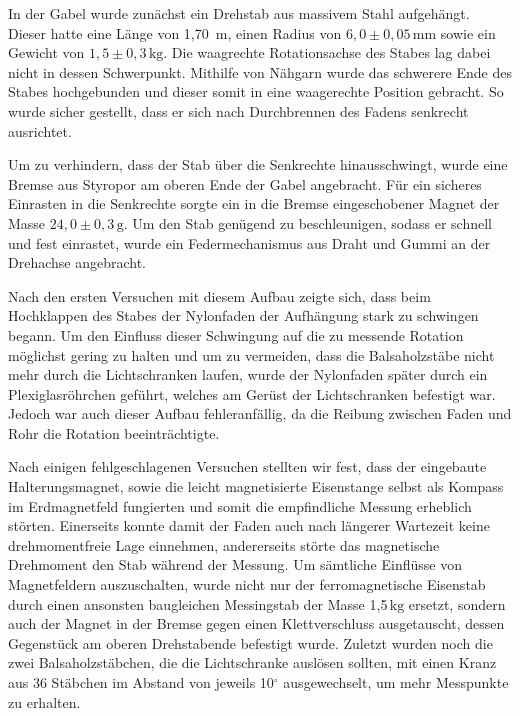 \documentclass[11pt]{scrartcl}
\newcommand{\unit}[1]{\ensuremath{\,\mathrm{#1}}} %
\begin{document}
In der Gabel wurde zun\"achst ein Drehstab aus massivem Stahl aufgeh\"angt. Dieser hatte eine L\"ange von 1,70 \unit{m}, einen Radius von $6,0\pm 0,05\unit{mm}$ sowie ein Gewicht von $1,5\pm 0,3\unit{kg}$. Die waagrechte Rotationsachse des Stabes lag dabei nicht in dessen Schwerpunkt. Mithilfe von N\"ahgarn wurde das schwerere Ende des Stabes hochgebunden und dieser somit in eine waagerechte Position gebracht. So wurde sicher gestellt, dass er sich nach Durchbrennen des Fadens senkrecht ausrichtet.

Um zu verhindern, dass der Stab \"uber die Senkrechte hinausschwingt, wurde eine Bremse aus Styropor am oberen Ende der Gabel angebracht. F\"ur ein sicheres Einrasten in die Senkrechte sorgte ein in die Bremse eingeschobener Magnet der Masse $24,0 \pm 0,3\unit{g}$. Um den Stab gen\"ugend zu beschleunigen, sodass er schnell und fest einrastet, wurde ein Federmechanismus aus Draht und Gummi an der Drehachse angebracht. %
%

Nach den ersten Versuchen mit diesem Aufbau zeigte sich, dass beim Hochklappen des Stabes der Nylonfaden der Aufh\"angung stark zu schwingen begann. Um den Einfluss dieser Schwingung auf die zu messende Rotation m\"oglichst gering zu halten und um zu vermeiden, dass die Balsaholzst\"abe nicht mehr durch die Lichtschranken laufen, wurde der Nylonfaden sp\"ater durch ein Plexiglasr\"ohrchen gef\"uhrt, welches am Gerüst der Lichtschranken befestigt war. Jedoch war auch dieser Aufbau fehleranf\"allig, da die Reibung zwischen Faden und Rohr die Rotation beeintr\"achtigte.

Nach einigen fehlgeschlagenen Versuchen stellten wir fest, dass der eingebaute Halterungsmagnet, sowie die leicht magnetisierte Eisenstange selbst als Kompass im Erdmagnetfeld fungierten und somit die empfindliche Messung erheblich störten.
Einerseits konnte damit der Faden auch nach längerer Wartezeit keine drehmomentfreie Lage einnehmen, andererseits störte das magnetische Drehmoment den Stab während der Messung.
Um s\"amtliche Einfl\"usse von Magnetfeldern auszuschalten, wurde nicht nur der ferromagnetische Eisenstab durch einen ansonsten baugleichen Messingstab der Masse 1,5\unit{kg} ersetzt, sondern auch der Magnet in der Bremse gegen einen Klettverschluss ausgetauscht, dessen Gegenst\"uck am oberen Drehstabende befestigt wurde. Zuletzt wurden noch die zwei Balsaholzst\"abchen, die die Lichtschranke ausl\"osen sollten, mit einen Kranz aus 36 St\"abchen im Abstand von jeweils 10$^{\circ}$ ausgewechselt, um mehr Messpunkte zu erhalten.
\end{document}
